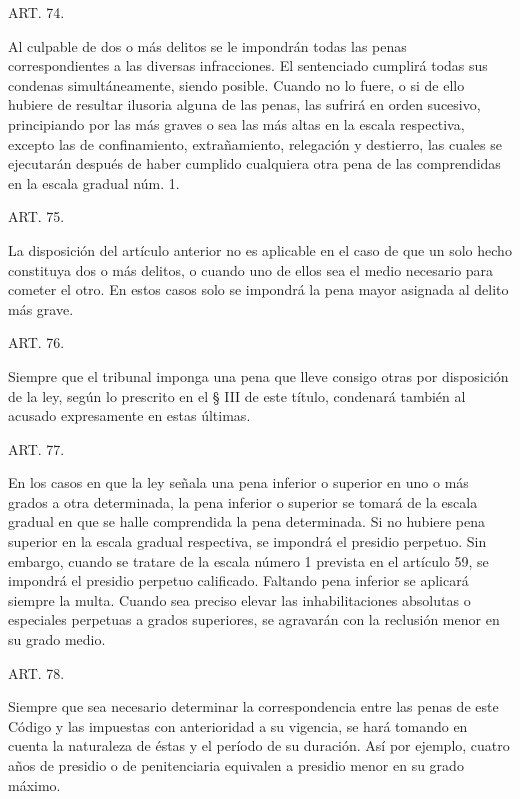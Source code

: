     ART. 74.

    Al culpable de dos o más delitos se le impondrán todas las penas correspondientes a las diversas infracciones.
    El sentenciado cumplirá todas sus condenas simultáneamente, siendo posible. Cuando no lo fuere, o si de ello hubiere de resultar ilusoria alguna de las penas, las sufrirá en orden sucesivo, principiando por las más graves o sea las más altas en la escala respectiva, excepto las de confinamiento, extrañamiento, relegación y destierro, las cuales se ejecutarán después de haber cumplido cualquiera otra pena de las comprendidas en la escala gradual núm. 1.



    ART. 75.

    La disposición del artículo anterior no es aplicable en el caso de que un solo hecho constituya dos o más delitos, o cuando uno de ellos sea el medio necesario para cometer el otro.
    En estos casos solo se impondrá la pena mayor asignada al delito más grave.




    ART. 76.

    Siempre que el tribunal imponga una pena que lleve consigo otras por disposición de la ley, según lo prescrito en el § III de este título, condenará también al acusado expresamente en estas últimas.



    ART. 77.

    En los casos en que la ley señala una pena inferior o superior en uno o más grados a otra determinada, la pena inferior o superior se tomará de la escala gradual en que se halle comprendida la pena determinada.
    Si no hubiere pena superior en la escala gradual respectiva, se impondrá el presidio perpetuo. Sin embargo, cuando se tratare de la escala número 1 prevista en el artículo 59, se impondrá el presidio perpetuo calificado.
    Faltando pena inferior se aplicará siempre la multa.
    Cuando sea preciso elevar las inhabilitaciones absolutas o especiales perpetuas a grados superiores, se agravarán con la reclusión menor en su grado medio.   




    ART. 78.

    Siempre que sea necesario determinar la correspondencia entre las penas de este Código y las impuestas con anterioridad a su vigencia, se hará tomando en cuenta la naturaleza de éstas y el período de su duración. Así por ejemplo, cuatro años de presidio o de penitenciaria equivalen a presidio menor en su grado máximo.


